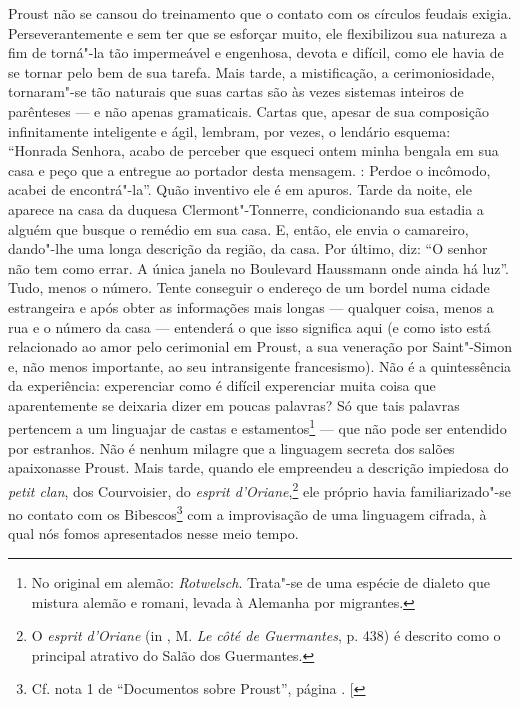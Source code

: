 Proust não se cansou do treinamento que o contato com os círculos
feudais exigia. Perseverantemente e sem ter que se esforçar muito, ele
flexibilizou sua natureza a fim de torná"-la tão impermeável e engenhosa,
devota e difícil, como ele havia de se tornar pelo bem de sua tarefa.
Mais tarde, a mistificação, a cerimoniosidade, tornaram"-se tão
naturais que suas cartas são às vezes sistemas inteiros de parênteses ---
e não apenas gramaticais. Cartas que, apesar de sua composição
infinitamente inteligente e ágil, lembram, por vezes, o lendário
esquema: ``Honrada Senhora, acabo de perceber que esqueci ontem minha
bengala em sua casa e peço que a entregue ao portador desta mensagem.
: Perdoe o incômodo, acabei de encontrá"-la''. Quão inventivo ele é
em apuros. Tarde da noite, ele aparece na casa da duquesa
Clermont"-Tonnerre, condicionando sua estadia a alguém que busque o
remédio em sua casa. E, então, ele envia o camareiro, dando"-lhe uma
longa descrição da região, da casa. Por último, diz: ``O senhor não tem
como errar. A única janela no Boulevard Haussmann onde ainda há luz''.
Tudo, menos o número. Tente conseguir o endereço de um bordel numa
cidade estrangeira e após obter as informações mais longas --- qualquer
coisa, menos a rua e o número da casa --- entenderá o que isso significa
aqui (e como isto está relacionado ao amor pelo cerimonial em Proust, a
sua veneração por Saint"-Simon e, não menos importante, ao seu
intransigente francesismo). Não é a quintessência da experiência:
experenciar como é difícil experenciar muita coisa que aparentemente
se deixaria dizer em poucas palavras? Só que tais palavras pertencem a
um linguajar de castas e estamentos\footnote{No original em alemão:
  \emph{Rotwelsch}. Trata"-se de uma espécie de dialeto que mistura
  alemão e romani, levada à Alemanha por migrantes. \versal{[N.~T.]}} --- que não pode ser
entendido por estranhos. Não é nenhum milagre que a linguagem secreta
dos salões apaixonasse Proust. Mais tarde, quando ele empreendeu a
descrição impiedosa do \emph{petit clan}, dos Courvoisier, do
\emph{esprit d'Oriane},\footnote{O \emph{esprit d'Oriane} (in ,
  M. \emph{Le côté de Guermantes}, p. 438) é descrito como o principal
  atrativo do Salão dos Guermantes. \versal{[N.~O.]}} ele próprio havia familiarizado"-se
no contato com os Bibescos\footnote{Cf. nota 1 de ``Documentos sobre Proust'', página \pageref{bibescos}. {[}\versal{N.~O.}{]}} com a improvisação de uma linguagem cifrada,
à qual nós fomos apresentados nesse meio tempo.

